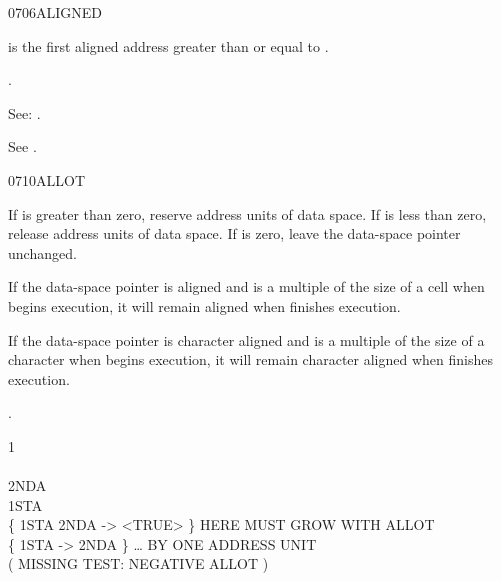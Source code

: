 \begin{worddef}{0706}{ALIGNED}
\item {}

	 is the first aligned address greater than or equal
	to .

\see {}.

	\begin{defer}
	\rationale %
		See: .

	\testing\rmfamily
		See .
	\end{defer}
\end{worddef}


\begin{worddef}{0710}{ALLOT}
\item {}

	If  is greater than zero, reserve  address units
	of data space. If  is less than zero, release \param{|n|}
	address units of data space. If  is zero, leave the
	data-space pointer unchanged.

	If the data-space pointer is aligned and  is a multiple
	of the size of a cell when  begins execution, it will
	remain aligned when  finishes execution.

	If the data-space pointer is character aligned and  is a
	multiple of the size of a character when  begins
	execution, it will remain character aligned when \word{ALLOT}
	finishes execution.

\see {}.

	\begin{defer}
	\testing
		 1 \word{ALLOT} \\
		\word{HERE} \\
		 2NDA \\
		 1STA \\
		\{ 1STA 2NDA  -> <TRUE> \}	\tab {} HERE MUST GROW WITH ALLOT \\
		\{ 1STA  -> 2NDA \}			\tab[4.2]  {\ldots} BY ONE ADDRESS UNIT \\
		( MISSING TEST: NEGATIVE ALLOT )
	\end{defer}
\end{worddef}


